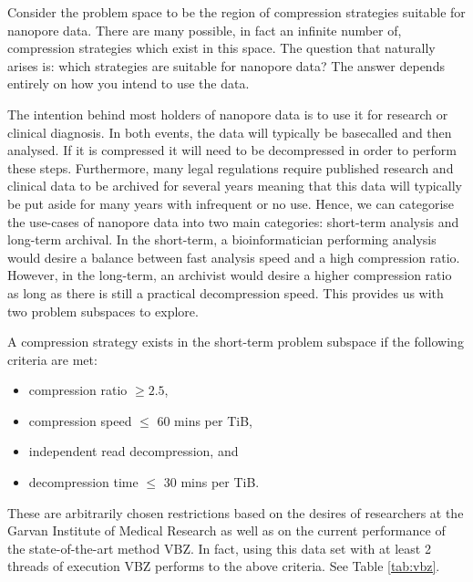 

Consider the problem space to be the region of compression strategies suitable for nanopore data.
There are many possible, in fact an infinite number of, compression strategies which exist in this space.
The question that naturally arises is: which strategies are suitable for nanopore data?
The answer depends entirely on how you intend to use the data.

The intention behind most holders of nanopore data is to use it for research or clinical diagnosis. In both events, the data will typically be basecalled and then analysed. If it is compressed it will need to be decompressed in order to perform these steps. Furthermore, many legal regulations require published research and clinical data to be archived for several years meaning that this data will typically be put aside for many years with infrequent or no use. Hence, we can categorise the use-cases of nanopore data into two main categories: short-term analysis and long-term archival. In the short-term, a bioinformatician performing analysis would desire a balance between fast analysis speed and a high compression ratio. However, in the long-term, an archivist would desire a higher compression ratio as long as there is still a practical decompression speed. This provides us with two problem subspaces to explore.

A compression strategy exists in the short-term problem subspace if
the following criteria are met:
\begin{itemize}
\item compression ratio $\ge 2.5$,
\item compression speed $\le$ 60 mins per TiB,
\item independent read decompression, and
\item decompression time $\le$ 30 mins per TiB.
\end{itemize}

These are arbitrarily chosen restrictions based on the desires of researchers at the Garvan Institute of Medical Research as well as on the current performance of the state-of-the-art method VBZ. In fact, using this data set with at least 2 threads of execution VBZ performs to the above criteria. See Table \ref{tab:vbz}.

